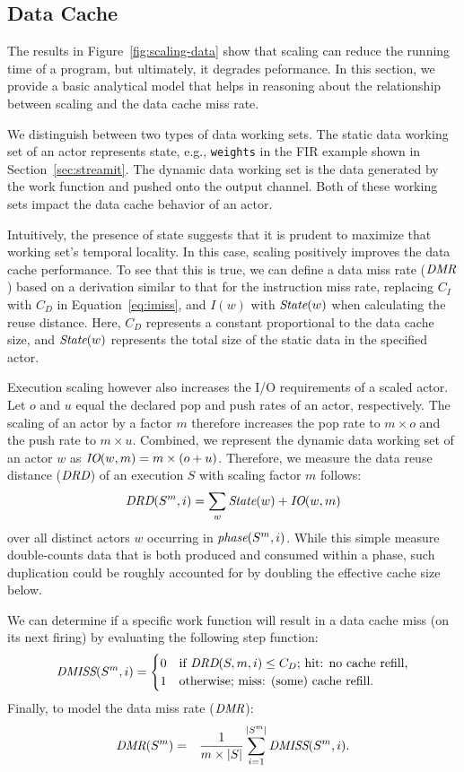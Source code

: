 \subsection{Data Cache}

The results in Figure~\ref{fig:scaling-data} show that scaling can
reduce the running time of a program, but ultimately, it degrades
peformance. In this section, we provide a basic analytical model that
helps in reasoning about the relationship between scaling and the data
cache miss rate. 

We distinguish between two types of data working sets. The static data
working set of an actor represents state, e.g., \texttt{weights} in
the FIR example shown in Section~\ref{sec:streamit}.  The dynamic data
working set is the data generated by the work function and pushed onto
the output channel. Both of these working sets impact the data cache
behavior of an actor.

Intuitively, the presence of state suggests that it is
prudent to maximize that working set's temporal locality. In this
case, scaling positively improves the data cache performance. To see
that this is true, we can define a data miss rate ($\mbox{\it DMR}$) based on
a derivation similar to that for the instruction miss rate, replacing
$C_I$ with $C_D$ in Equation~\ref{eq:imiss}, and $I(w)$ with
$\mbox{\it State}(w)$ when calculating the reuse distance. Here, $C_D$
represents a constant proportional to the data cache size, and
$\mbox{\it State}(w)$ represents the total size of the static data in the
specified actor. 

Execution scaling however also increases the I/O requirements of a
scaled actor. Let $o$ and $u$ equal the declared pop and push rates
of an actor, respectively.  The scaling of an
actor by a factor $m$ therefore increases the pop rate to $m\times o$
and the push rate to $m\times u$. Combined, we represent the dynamic
data working set of an actor $w$ as $\mbox{\it IO}(w, m) =
m\times(o+u)$. Therefore, we measure the data reuse distance ($\mbox{\it DRD}$)
of an execution $S$ with scaling factor $m$ follows:
\[
  \mbox{\it DRD}(S^m,i)=\sum_{w} \mbox{\it State}(w) + \mbox{\it IO}(w,m)
\]
over all distinct actors $w$ occurring in $\mbox{\it phase}(S^m,i)$.  While
this simple measure double-counts data that is both produced and
consumed within a phase, such duplication could be roughly accounted
for by doubling the effective cache size below.  

We can determine if a
specific work function will result in a data cache miss (on its next
firing) by evaluating the following step function:
\begin{equation}
\label{eq:dmiss}
  \mbox{\it DMISS}(S^m,i) =
    \begin{cases}
      0& \text{if $\mbox{\it DRD}(S,m,i) \leq C_D$; hit: no cache refill,}\\
      1& \text{otherwise; miss: (some) cache refill.}
    \end{cases}
\end{equation}
Finally, to model the data miss rate ($\mbox{\it DMR}$):
\begin{eqnarray}
  \label{eq:dmrM}
  \mbox{\it DMR}(S^m) &=& \frac{1}{m \times |S|}\sum_{i=1}^{|S^m|} \mbox{\it DMISS}(S^m,i).
\end{eqnarray}

